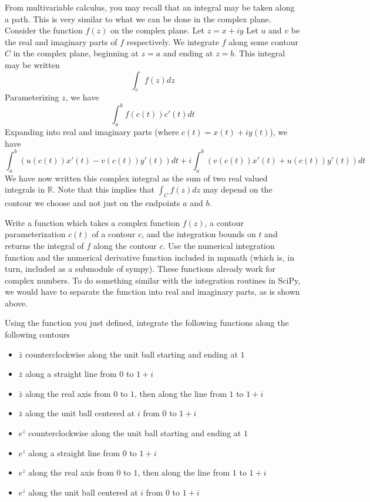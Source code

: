 From multivariable calculus, you may recall that an integral may be taken along a path.
This is very similar to what we can be done in the complex plane.
Consider the function $f(z)$ on the complex plane.
Let $z=x+iy$ Let $u$ and $v$ be the real and imaginary parts of $f$ respectively.
We integrate $f$ along some contour $C$ in the complex plane, beginning at $z=a$ and ending at $z=b$.
This integral may be written
\[\int_c f(z)dz\]
Parameterizing $z$, we have
\[\int_a^b f\left( c\left(t\right)\right) c'\left(t\right) dt\]
Expanding into real and imaginary parts (where $c\left(t\right) = x\left(t\right) + i y\left(t\right)$), we have
\[\int_a^b \left(u \left(c \left(t\right)\right) x'\left(t\right)-v\left(c \left(t\right)\right) y'\left(t\right)\right) dt + i \int_a^b\left(v \left(c \left(t\right)\right)x'\left(t\right)+u\left(c \left(t\right)\right) y'\left(t\right)\right) dt\]
We have now written this complex integral as the sum of two real valued integrals in $\mathbb{R}$.
Note that this implies that $\int_C f(z) dz$ may depend on the contour we choose and not just on the endpoints $a$ and $b$.

\begin{problem}
Write a function which takes a complex function $f(z)$, a contour parameterization $c(t)$ of a contour $c$, and the integration bounds on $t$ and returns the integral of $f$ along the contour $c$.
Use the numerical integration function  and the numerical derivative function  included in mpmath (which is, in turn, included as a submodule of sympy).
These functions already work for complex numbers.
To do something similar with the integration routines in SciPy, we would have to separate the function into real and imaginary parts, as is shown above.

Using the function you just defined, integrate the following functions along the following contours
\begin{itemize}
\item $\bar{z}$ counterclockwise along the unit ball starting and ending at $1$
\item $\bar{z}$ along a straight line from $0$ to $1+i$
\item $\bar{z}$ along the real axis from $0$ to $1$, then along the line from $1$ to $1+i$
\item $\bar{z}$ along the unit ball centered at $i$ from $0$ to $1+i$
\item $e^z$ counterclockwise along the unit ball starting and ending at $1$
\item $e^z$ along a straight line from $0$ to $1+i$
\item $e^z$ along the real axis from $0$ to $1$, then along the line from $1$ to $1+i$
\item $e^z$ along the unit ball centered at $i$ from $0$ to $1+i$
\end{itemize}
\end{problem}

